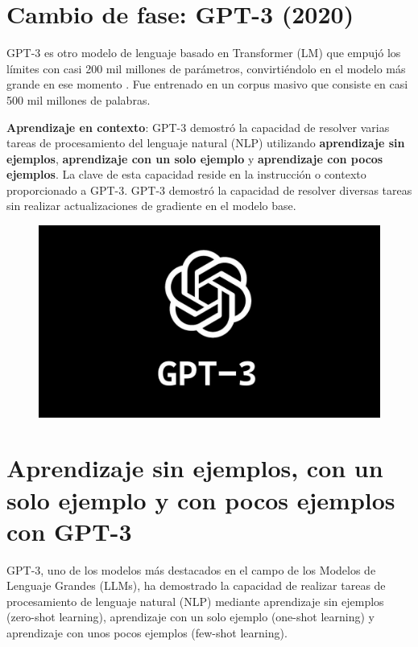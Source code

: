 \section{Cambio de fase: GPT-3 (2020)}
GPT-3 es otro modelo de lenguaje basado en Transformer (LM) que empujó los límites con casi 200 mil millones de parámetros, convirtiéndolo en el modelo más grande en ese momento \cite{brown2020language}. Fue entrenado en un corpus masivo que consiste en casi 500 mil millones de palabras.

\textbf{Aprendizaje en contexto}: GPT-3 demostró la capacidad de resolver varias tareas de procesamiento del lenguaje natural (NLP) utilizando \textbf{aprendizaje sin ejemplos}, \textbf{aprendizaje con un solo ejemplo} y \textbf{aprendizaje con pocos ejemplos}.  La clave de esta capacidad reside en la instrucción o contexto proporcionado a GPT-3.  GPT-3 demostró la capacidad de resolver diversas tareas sin realizar actualizaciones de gradiente en el modelo base.


 \begin{figure}[h]
        	\includegraphics[scale = 0.08]{pics/gpt3.png}
        \end{figure}




\section{Aprendizaje sin ejemplos, con un solo ejemplo y con pocos ejemplos con GPT-3}
GPT-3, uno de los modelos más destacados en el campo de los Modelos de Lenguaje Grandes (LLMs), ha demostrado la capacidad de realizar tareas de procesamiento de lenguaje natural (NLP) mediante aprendizaje sin ejemplos (zero-shot learning), aprendizaje con un solo ejemplo (one-shot learning) y aprendizaje con unos pocos ejemplos (few-shot learning).


